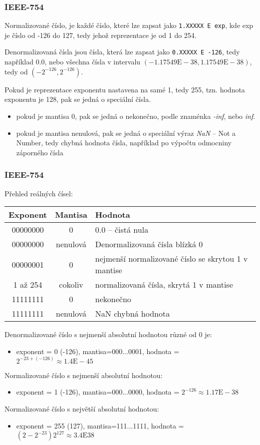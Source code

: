 \documentclass{beamer}
\begin{document}
\begin{frame}
\frametitle{IEEE-754}

Normalizované číslo, je každé číslo, které lze zapsat jako \texttt{1.XXXXX E exp}, kde exp je číslo od -126 do 127, tedy jehož reprezentace je od 1 do 254.

\bigskip
Denormalizovaná čísla jsou čísla, která lze zapsat jako \texttt{0.XXXXX E -126}, tedy například 0.0, nebo všechna čísla v intervalu $(-1.17549\text{E}-38,1.17549\text{E}-38)$, tedy od $(-2^{-126},2^{-126})$.

\bigskip
Pokud je reprezentace exponentu nastavena na samé 1, tedy 255, tzn. hodnota exponentu je 128, pak se jedná o speciální čísla. 
\begin{itemize}
\item pokud je mantisa 0, pak se jedná o nekonečno, podle znaménka \textit{-inf}, nebo \textit{inf}.
\item pokud je mantisa nenulová, pak se jedná o speciální výraz \textit{NaN} -- Not a Number, tedy chybná hodnota čísla, například po výpočtu odmocniny záporného čísla 
\end{itemize}
\end{frame}

\begin{frame}[shrink=5]
\frametitle{IEEE-754}

Přehled reálných čísel:
\begin{tabular}{|c|c|l|}\hline
Exponent & Mantisa &  Hodnota \\ \hline
00000000 & 0 &  0.0 -- čistá nula \\ \hline
00000000 & nenulová &  Denormalizovaná čísla blízká 0 \\ \hline
00000001 & 0 &  nejmenší normalizované číslo se skrytou 1 v mantise \\ \hline
\small 1 až 254 & cokoliv &  normalizovaná čísla, skrytá 1 v mantise \\ \hline
11111111 & 0 &  nekonečno \\ \hline
11111111 & nenulová &  NaN chybná hodnota \\ \hline
\end{tabular}
\bigskip

Denormalizované číslo s nejmenší absolutní hodnotou různé od 0 je:
\begin{itemize}
\item \small exponent = 0 (-126), mantisa=000...0001, hodnota = $2^{-23+(-126)} \approx 1.4\text{E}-45$
\end{itemize}
Normalizované číslo s nejmenší absolutní hodnotou:
\begin{itemize}
\item \small exponent = 1 (-126), mantisa=000...0000, hodnota = $2^{-126} \approx 1.17\text{E}-38$
\end{itemize}
Normalizované číslo s největší absolutní hodnotou:
\begin{itemize}
\item \small exponent = 255 (127), mantisa=111...1111, hodnota = $(2-2^{-23})2^{127} \approx 3.4\text{E}38$
\end{itemize}
\end{frame}
\end{document}
